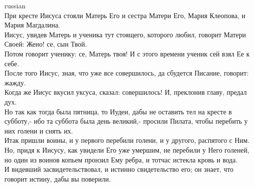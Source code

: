 \documentclass[10pt]{article} %
\begin{document}
{\begin{minipage}[t]{0.45\textwidth}
\begin{otherlanguage*}{russian}
\\
При кресте Иисуса стояли Матерь Его и сестра Матери Его, Мария Клеопова, и Мария Магдалина.
\\
Иисус, увидев Матерь и ученика тут стоящего, которого любил, говорит Матери Своей: Жено! се, сын Твой.
\\
Потом говорит ученику: се, Матерь твоя! И с этого времени ученик сей взял Ее к себе.
\\
После того Иисус, зная, что уже все совершилось, да сбудется Писание, говорит: жажду.
\\
Когда же Иисус вкусил уксуса, сказал: совершилось! И, преклонив главу, предал дух.
\\
Но так как тогда была пятница, то Иудеи, дабы не оставить тел на кресте в субботу,- ибо та суббота была день великий,- просили Пилата, чтобы перебить у них голени и снять их.
\\
Итак пришли воины, и у первого перебили голени, и у другого, распятого с Ним.
\\
Но, придя к Иисусу, как увидели Его уже умершим, не перебили у Него голеней,
\\
но один из воинов копьем пронзил Ему ребра, и тотчас истекла кровь и вода.
\\
И видевший засвидетельствовал, и истинно свидетельство его; он знает, что говорит истину, дабы вы поверили.
\\

\end{otherlanguage*}
\end{minipage}
\hfill
\begin{minipage}[t]{0.45\textwidth}


\end{minipage}}
\end{document}
